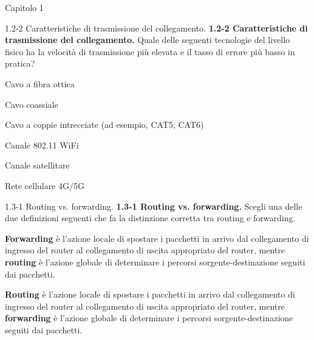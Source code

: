 \documentclass[a4paper]{article}
\begin{document}
\begin{quiz}{Capitolo 1}
\begin{multi}[points=1,shuffle=true]{1.2-2 Caratteristiche di trasmissione del collegamento.}
\textbf{1.2-2 Caratteristiche di trasmissione del collegamento.}
Quale delle seguenti tecnologie del livello fisico ha la velocità di trasmissione più elevata e il tasso di errore più basso in pratica?
\item* Cavo a fibra ottica
\item Cavo coassiale
\item Cavo a coppie intrecciate (ad esempio, CAT5, CAT6)
\item Canale 802.11 WiFi
\item Canale satellitare
\item Rete cellulare 4G/5G
\end{multi}

\begin{multi}[points=1,shuffle=true]{1.3-1 Routing vs. forwarding.}
\textbf{1.3-1 Routing vs. forwarding.} 
Scegli una delle due definizioni seguenti che fa la distinzione corretta tra routing e forwarding.
\item* \textbf{Forwarding} è l'azione locale di spostare i pacchetti in arrivo dal collegamento di ingresso del router al collegamento di uscita appropriato del router, mentre \textbf{routing} è l'azione globale di determinare i percorsi sorgente-destinazione seguiti dai pacchetti.
\item \textbf{Routing} è l'azione locale di spostare i pacchetti in arrivo dal collegamento di ingresso del router al collegamento di uscita appropriato del router, mentre \textbf{forwarding} è l'azione globale di determinare i percorsi sorgente-destinazione seguiti dai pacchetti.
\end{multi}


\end{quiz}
\end{document}
